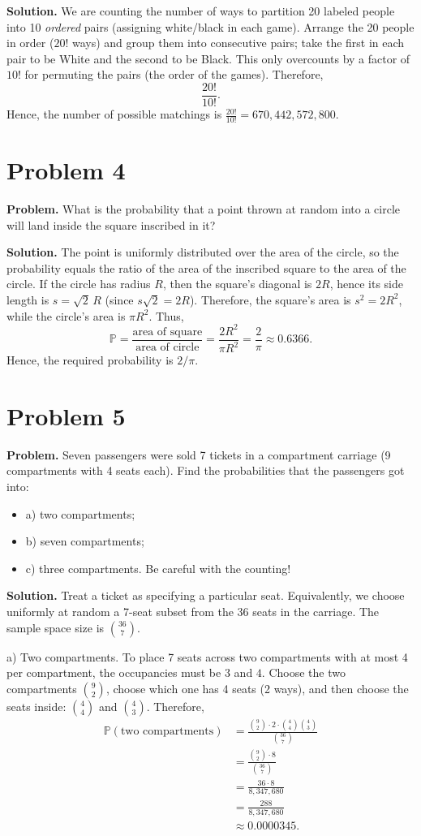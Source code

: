 \documentclass{article}
\begin{document}
\textbf{Solution.} We are counting the number of ways to partition 20 labeled people into 10 \emph{ordered} pairs (assigning white/black in each game). Arrange the 20 people in order ($20!$ ways) and group them into consecutive pairs; take the first in each pair to be White and the second to be Black. This only overcounts by a factor of $10!$ for permuting the pairs (the order of the games). Therefore,
\[
\frac{20!}{10!}.
\]
Hence, the number of possible matchings is $\displaystyle \frac{20!}{10!}=670{,}442{,}572{,}800$.
\section{Problem 4}

\textbf{Problem.} What is the probability that a point thrown at random into a circle will land inside the square inscribed in it?

\textbf{Solution.} The point is uniformly distributed over the area of the circle, so the probability equals the ratio of the area of the inscribed square to the area of the circle. If the circle has radius $R$, then the square's diagonal is $2R$, hence its side length is $s = \sqrt{2}\,R$ (since $s\sqrt{2} = 2R$). Therefore, the square's area is $s^2 = 2R^2$, while the circle's area is $\pi R^2$. Thus,
\[
\mathbb{P} = \frac{\text{area of square}}{\text{area of circle}} = \frac{2R^2}{\pi R^2} = \frac{2}{\pi} \approx 0.6366.
\]
Hence, the required probability is $2/\pi$.
\section{Problem 5}

\textbf{Problem.} Seven passengers were sold 7 tickets in a compartment carriage (9 compartments with 4 seats each). Find the probabilities that the passengers got into:
\begin{itemize}
\item a) two compartments;
\item b) seven compartments;
\item c) three compartments. Be careful with the counting!
\end{itemize}

\textbf{Solution.} Treat a ticket as specifying a particular seat. Equivalently, we choose uniformly at random a 7-seat subset from the 36 seats in the carriage. The sample space size is \(\binom{36}{7}\).

a) Two compartments. To place 7 seats across two compartments with at most 4 per compartment, the occupancies must be \(3\) and \(4\). Choose the two compartments \(\binom{9}{2}\), choose which one has 4 seats (2 ways), and then choose the seats inside: \(\binom{4}{4}\) and \(\binom{4}{3}\). Therefore,
\begin{align*}
\mathbb{P}(\text{two compartments})
&= \frac{\binom{9}{2}\cdot 2 \cdot \binom{4}{4}\binom{4}{3}}{\binom{36}{7}} \\
&= \frac{\binom{9}{2}\cdot 8}{\binom{36}{7}} \\
&= \frac{36 \cdot 8}{8{,}347{,}680} \\
&= \frac{288}{8{,}347{,}680} \\
&\approx 0.0000345.
\end{align*}
\end{document}
